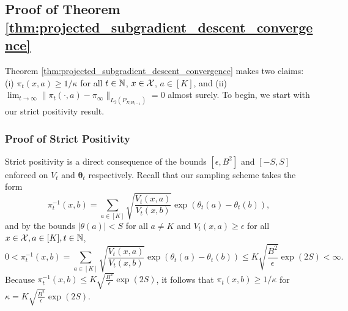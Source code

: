 \documentclass{article}
\begin{document}
\begin{appendices}
\subsection{Proof of Theorem \ref{thm:projected_subgradient_descent_convergence}}

Theorem \ref{thm:projected_subgradient_descent_convergence} makes two claims: (i) $\pi_t(x,a) \geq 1/\kappa$ for all $t \in \mathbb{N}$, $x \in \mathcal{X}$, $a \in [K]$, and (ii) $\lim_{t \rightarrow \infty} \|\pi_t(\cdot, a) - \pi_\infty\|_{L_2(P_{X|H_{t-1}})} = 0$ almost surely. To begin, we start with our strict positivity result. 

\subsubsection{Proof of Strict Positivity}
Strict positivity is a direct consequence of the bounds $[\epsilon, B^2]$ and $[-S,S]$ enforced on $V_t$ and $\bm{\theta}_t$ respectively. Recall that our sampling scheme takes the form
\begin{equation}
    \pi_t^{-1}(x,b) = \sum_{a \in [K]} \sqrt{\frac{V_t(x,a)}{V_t(x,b)}} \exp(\theta_t(a) - \theta_t(b)),
\end{equation}
and by the bounds $|\theta(a)| < S$ for all $a \neq K$ and $V_t(x,a) \geq \epsilon$ for all $x \in \mathcal{X}, a \in [K], t \in \mathbb{N}$, 
\begin{equation}\label{eq:l0}
    0 <\pi_t^{-1}(x,b) = \sum_{a \in [K]} \sqrt{\frac{V_t(x,a)}{V_t(x,b)}} \exp(\theta_t(a) - \theta_t(b)) \leq K \sqrt{\frac{B^2}{\epsilon}}\exp(2S) < \infty.
\end{equation}
Because $\pi_t^{-1}(x,b) \leq K \sqrt{\frac{B^2}{\epsilon}}\exp(2S)$, it follows that $\pi_t(x,b) \geq 1/\kappa$ for $\kappa = K \sqrt{\frac{B^2}{\epsilon}}\exp(2S)$.  


\end{appendices}
\end{document}
